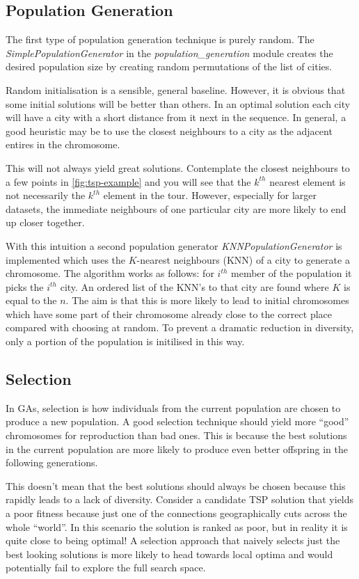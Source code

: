 \documentclass[journal]{IEEEtran}
\begin{document}
\subsection{Population Generation}
The first type of population generation technique is purely random. The \textit{SimplePopulationGenerator} in the \textit{population\_generation} module creates the desired population size by creating random permutations of the list of cities. 

Random initialisation is a sensible, general baseline. However, it is obvious that some initial solutions will be better than others. In an optimal solution each city will have a city with a short distance from it next in the sequence. In general, a good heuristic may be to use the closest neighbours to a city as the adjacent entires in the chromosome. 

This will not always yield great solutions. Contemplate the closest neighbours to a few points in \ref{fig:tsp-example} and you will see that the $k^{th}$ nearest element is not necessarily the $k^{th}$ element in the tour. However, especially for larger datasets, the immediate neighbours of one particular city are more likely to end up closer together.

With this intuition a second population generator \textit{KNNPopulationGenerator} \cite{pullan2003adapting} is implemented which uses the $K$-nearest neighbours (KNN) of a city to generate a chromosome. The algorithm works as follows: for $i^{th}$ member of the population it picks the $i^{th}$ city. An ordered list of the KNN's to that city are found where $K$ is equal to the $n$. The aim is that this is more likely to lead to initial chromosomes which have some part of their chromosome already close to the correct place compared with choosing at random. To prevent a dramatic reduction in diversity, only a portion of the population is initilised in this way.

\subsection{Selection}
In GAs, selection is how individuals from the current population are chosen to produce a new population. A good selection technique should yield more ``good'' chromosomes for reproduction than bad ones. This is because the best solutions in the current population are more likely to produce even better offspring in the following generations.

This doesn't mean that the best solutions should always be chosen because this rapidly leads to a lack of diversity. Consider a candidate TSP solution that yields a poor fitness because just one of the connections geographically cuts across the whole ``world''. In this scenario the solution is ranked as poor, but in reality it is quite close to being optimal! A selection approach that naively selects just the best looking solutions is more likely to head towards local optima and would potentially fail to explore the full search space.
\end{document}
